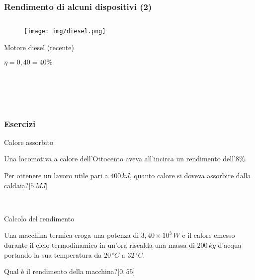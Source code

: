 \documentclass[]{beamer}
\theoremstyle{plain}
\begin{document}
\begin{frame}
  \frametitle{Rendimento di alcuni dispositivi (2)}
  \begin{columns}
    \begin{column}{0.3\textwidth}
      \begin{figure}
        \texttt{[image: img/diesel.png]}
      \end{figure}
      Motore diesel (recente)
      
      $ \eta = 0,40 = 40 \% $
    \end{column}
    \begin{column}{0.3\textwidth}
    \end{column}
    \begin{column}{0.3\textwidth}
    \end{column}
  \end{columns}

  ~

  ~

\end{frame}


\begin{frame}
\frametitle{Esercizi}
\begin{exampleblock}{Calore assorbito}
  \small{
  Una locomotiva a calore dell'Ottocento aveva all'incirca un rendimento dell'$ 8\% $.

  Per ottenere un lavoro utile pari a $ 400 \, kJ $, quanto calore si doveva assorbire dalla caldaia?\hspace*{\fill}[$ 5 \, MJ $]}
\end{exampleblock}

~

\begin{exampleblock}{Calcolo del rendimento}
  \small{
  Una macchina termica eroga una potenza di $ 3,40 \times 10^{3} \, W $ e il calore emesso durante il ciclo termodinamico in un'ora riscalda una massa di $ 200 \, kg $ d'acqua portando la sua temperatura da $ 20 \, ^\circ C $ a $ 32 \, ^\circ C $.

  Qual è il rendimento della macchina?\hspace*{\fill}[$ 0,55 $]}
\end{exampleblock}
\end{frame}
\end{document}
